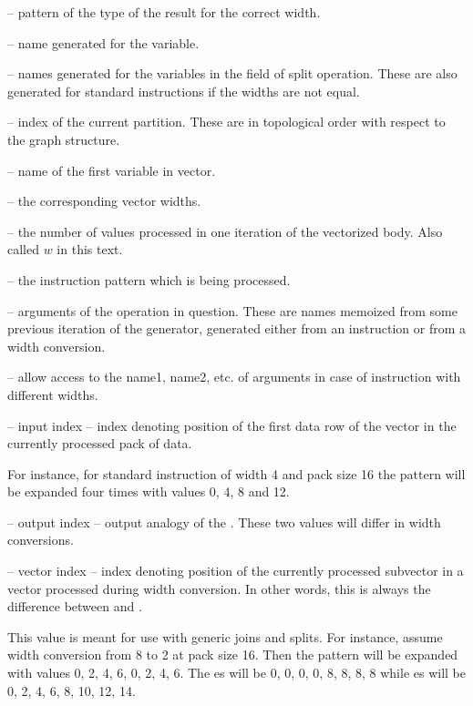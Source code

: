 \begin{description}
\item{} -- pattern of the type of the result for the correct width.
\item{} -- name generated for the variable.
\item{} -- names generated for the variables in the  field of split operation. These are also generated for standard instructions if the widths are not equal.
\item{} -- index of the current partition. These are in topological order with respect to the graph structure.
\item{}  -- name of the first variable in vector. 
\item{}  -- the corresponding vector widths.
\item{}  -- the number of values processed in one iteration of the vectorized body. Also called $w$ in this text.
\item{} -- the instruction pattern which is being processed.
\item{} -- arguments of the operation in question. These are names memoized from some previous iteration of the generator, generated either from an instruction or from a width conversion.
\item{} -- allow access to the name1, name2, etc. of arguments in case of instruction with different widths.
\item{} -- input index -- index denoting position of the first data row of the vector in the currently processed pack of data. 

  For instance, for standard instruction of width 4 and pack size 16 the pattern will be expanded four times with values  0, 4, 8 and 12.

\item{} -- output index -- output analogy of the . These two values will differ in width conversions.


\item{} -- vector index -- index denoting position of the currently processed subvector in a vector processed during width conversion. In other words, this is always the difference between  and .

This value is meant for use with generic joins and splits. For instance, assume width conversion from 8 to 2 at pack size 16. Then the  pattern will be expanded with values 0, 2, 4, 6, 0, 2, 4, 6. The es will be 0, 0, 0, 0, 8, 8, 8, 8 while es will be 0, 2, 4, 6, 8, 10, 12, 14.
\end{description}


